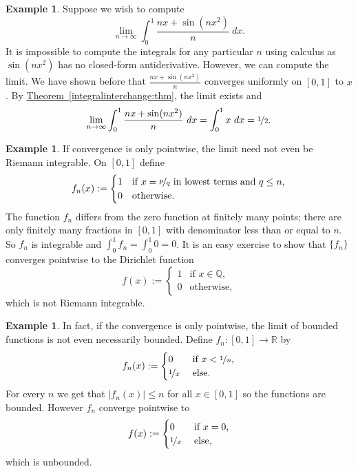 \documentclass[12pt]{book}
\newcommand{\abs}[1]{\left\lvert {#1} \right\rvert}
\newcommand{\R}{{\mathbb{R}}}
\newcommand{\Q}{{\mathbb{Q}}}
\theoremstyle{plain}
\theoremstyle{remark}
\theoremstyle{definition}
\theoremstyle{exercise}
\theoremstyle{example}
\newtheorem{example}[thm]{Example}
\newcommand{\thmref}[1]{\hyperref[#1]{Theorem~\ref*{#1}}}
\begin{document}
\begin{example}
Suppose we wish to compute
\begin{equation*}
\lim_{n\to\infty} \int_0^1 \frac{nx+ \sin(nx^2)}{n} ~dx .
\end{equation*}
It is impossible to compute the integrals for any particular $n$ using 
calculus as $\sin(nx^2)$ has no closed-form antiderivative.  However,
we can compute the limit.
We have shown before that $\frac{nx+ \sin(nx^2)}{n}$ converges uniformly
on $[0,1]$ to $x$.
By \thmref{integralinterchange:thm}, the limit exists and
\begin{equation*}
\lim_{n\to\infty} \int_0^1 \frac{nx+ \sin(nx^2)}{n} ~dx
=
\int_0^1
x ~dx = \nicefrac{1}{2} .
\end{equation*}
\end{example}

\begin{example}
If convergence is only pointwise, the limit need not even be Riemann
integrable.  On $[0,1]$ define
\begin{equation*}
f_n(x) :=
\begin{cases}
1 & \text{if $x = \nicefrac{p}{q}$ in lowest terms and $q \leq n$,} \\
0 & \text{otherwise.}
\end{cases}
\end{equation*}
The function $f_n$ differs from the zero function at finitely many points;
there are only finitely many fractions in $[0,1]$ with denominator less than
or equal to $n$.   So $f_n$ is integrable and $\int_0^1 f_n = \int_0^1 0 =
0$.  It is an easy exercise to show that $\{ f_n \}$ converges pointwise to the
Dirichlet function
\begin{equation*}
f(x) :=
\begin{cases}
1 & \text{if $x \in \Q$,} \\
0 & \text{otherwise,}
\end{cases}
\end{equation*}
which is not Riemann integrable.
\end{example}

\begin{example}
In fact, if the convergence is only pointwise, the limit of bounded
functions is not even necessarily bounded.
Define $f_n \colon [0,1] \to \R$ by
\begin{equation*}
f_n(x) :=
\begin{cases}
0 & \text{ if $x < \nicefrac{1}{n}$,}\\
\nicefrac{1}{x} & \text{ else.}
\end{cases}
\end{equation*}
For every $n$ we get that $\abs{f_n(x)} \leq n$ for all $x \in [0,1]$ so the
functions are bounded.  However $f_n$ converge pointwise to
\begin{equation*}
f(x) :=
\begin{cases}
0 & \text{ if $x = 0$,}\\
\nicefrac{1}{x} & \text{ else,}
\end{cases}
\end{equation*}
which is unbounded.
\end{example}
\end{document}

